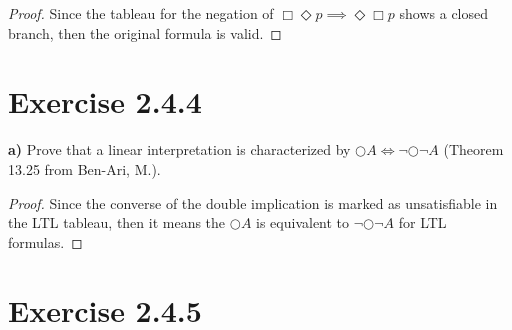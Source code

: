\documentclass[titlepage, letterpaper, fleqn]{article}
\newcommand{\spacepls}{\vspace{5mm}}
\begin{document}

\begin{proof}
Since the tableau for the negation of \(\Box \Diamond p \implies \Diamond \Box p\) shows a closed branch,
then the original formula is valid.
\end{proof}

\pagebreak

\section{Exercise 2.4.4}

{\large \textbf{a)} Prove that a linear interpretation is characterized by \(\bigcirc A \iff \neg \bigcirc \neg A\) (Theorem 13.25 from Ben-Ari, M.).}

\spacepls


\begin{proof}
Since the converse of the double implication is marked as unsatisfiable in the LTL tableau,
then it means the \(\bigcirc A\) is equivalent to \(\neg \bigcirc \neg A\) for LTL formulas.
\end{proof}

\section{Exercise 2.4.5}
\end{document}
